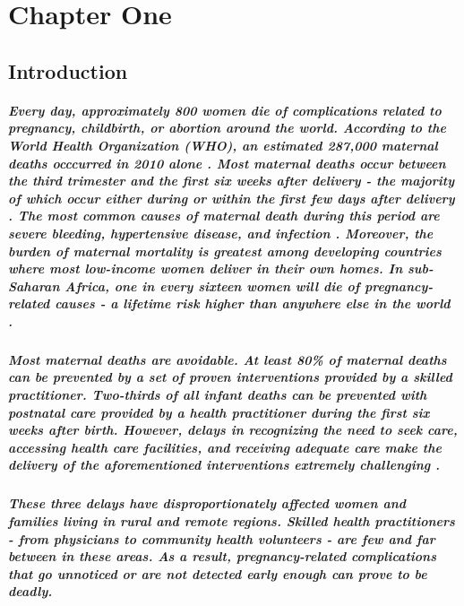 \chapter{Chapter One}
\section{Introduction}
\paragraph{Every day, approximately 800 women die of complications related to pregnancy, childbirth, or abortion around the world. According to the World Health Organization (WHO), an estimated 287,000 maternal deaths occcurred in 2010 alone \citep{WHO2012}. Most maternal deaths occur between the third trimester and the first six weeks after delivery - the majority of which occur either during or within the first few days after delivery \citep{WHO2012}. The most common causes of maternal death during this period are severe bleeding, hypertensive disease, and infection \citep{WHO2012}. Moreover, the burden of maternal mortality is greatest among developing countries where most low-income women deliver in their own homes. In sub-Saharan Africa, one in every sixteen women will die of pregnancy-related causes - a lifetime risk higher than anywhere else in the world \citep{Ronsmans2006}.}

\paragraph{Most maternal deaths are avoidable. At least 80\% of maternal deaths can be prevented by a set of proven interventions provided by a skilled practitioner. Two-thirds of all infant deaths can be prevented with postnatal care provided by a health practitioner during the first six weeks after birth. However, delays in recognizing the need to seek care, accessing health care facilities, and receiving  adequate care make the delivery of the aforementioned interventions extremely challenging \citep{Thaddeus1994}. }

\paragraph{These three delays have disproportionately affected women and families living in rural and remote regions. Skilled health practitioners - from physicians to community health volunteers - are few and far between in these areas.  As a result,  pregnancy-related complications that go unnoticed or are not detected early enough can prove to be deadly. }

